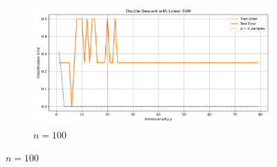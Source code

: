 \documentclass[twoside,10pt]{article}
\begin{document}
\begin{figure}[htb]
\begin{subfigure}[b]{\imgwidth}
  \end{subfigure}%
  \hfill
  \begin{subfigure}[b]{\imgwidth}
    \includegraphics[width=\linewidth]{img_qq/risk_curve_n70.png}
    \caption{$n=100$}\label{fig:2h1}
  \end{subfigure}

  \medskip


\end{figure}
\end{document}

